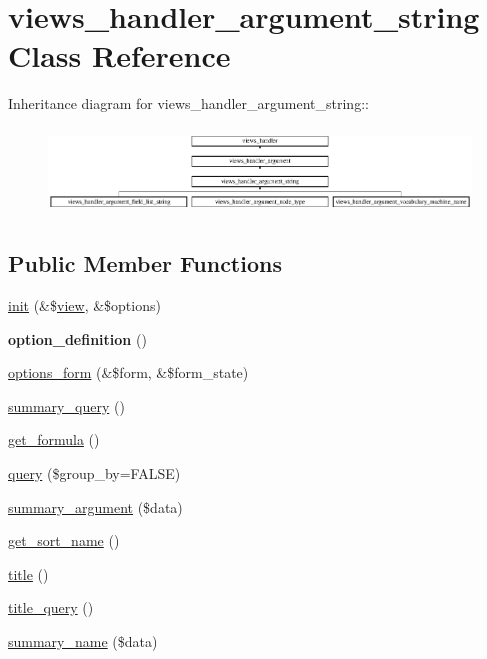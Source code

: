 \hypertarget{classviews__handler__argument__string}{
\section{views\_\-handler\_\-argument\_\-string Class Reference}
\label{classviews__handler__argument__string}
}
Inheritance diagram for views\_\-handler\_\-argument\_\-string::\begin{figure}[H]
\begin{center}
\leavevmode
\includegraphics[height=2.31166cm]{classviews__handler__argument__string}
\end{center}
\end{figure}
\subsection*{Public Member Functions}
\begin{DoxyCompactItemize}
\item 
\hyperlink{classviews__handler__argument__string_a504dc70451721c2b9ccae44240d13e2e}{init} (\&\$\hyperlink{classview}{view}, \&\$options)
\item 
\hypertarget{classviews__handler__argument__string_af27f79196cc9e29b2bbc635a896510e1}{
{\bfseries option\_\-definition} ()}
\label{classviews__handler__argument__string_af27f79196cc9e29b2bbc635a896510e1}

\item 
\hyperlink{classviews__handler__argument__string_ab96e2120f4f4458921f817b343d11ef0}{options\_\-form} (\&\$form, \&\$form\_\-state)
\item 
\hyperlink{classviews__handler__argument__string_a829ad5356d65f02a75af5d1e8374292b}{summary\_\-query} ()
\item 
\hyperlink{classviews__handler__argument__string_a8c039cb85ad264fd03ff5cdef379dfb5}{get\_\-formula} ()
\item 
\hyperlink{classviews__handler__argument__string_a71b6d00e2153228362f443353617a7be}{query} (\$group\_\-by=FALSE)
\item 
\hyperlink{classviews__handler__argument__string_a185c0d31b97f98df85073d53b3f8c26d}{summary\_\-argument} (\$data)
\item 
\hyperlink{classviews__handler__argument__string_a7f17c1b9687f36572d9dd2dee95002de}{get\_\-sort\_\-name} ()
\item 
\hyperlink{classviews__handler__argument__string_abd176c527d765826b51c50346309b545}{title} ()
\item 
\hyperlink{classviews__handler__argument__string_a2f90c113fcdf7c5f91ed3a11a0d5bc1c}{title\_\-query} ()
\item 
\hyperlink{classviews__handler__argument__string_a8cc60c274ca743c78de23260edc3ee4a}{summary\_\-name} (\$data)
\end{DoxyCompactItemize}


